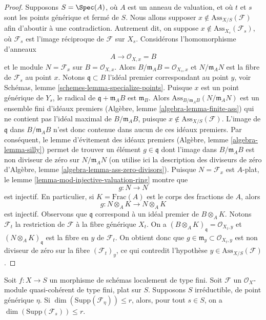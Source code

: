 \begin{proof}
\medskip\noindent
Supposons $S = \Spec(A)$, où $A$ est un anneau de valuation,
et où $t$ et $s$ sont les points générique et fermé de $S$.
Nous allons supposer $x \not \in \text{Ass}_{X/S}(\mathcal{F})$
afin d'aboutir à une contradiction. Autrement dit, on suppose
$x \not \in \text{Ass}_{X_s}(\mathcal{F}_s)$, où
$\mathcal{F}_s$ est l'image réciproque de $\mathcal{F}$ sur $X_s$.
Considérons l'homomorphisme d'anneaux
$$
A \longrightarrow \mathcal{O}_{X, x} = B
$$
et le module $N = \mathcal{F}_x$ sur $B = \mathcal{O}_{X, x}$.
Alors $B/\mathfrak m_A B = \mathcal{O}_{X_s, x}$ et
$N/\mathfrak m_A N$ est la fibre de $\mathcal{F}_s$ au point $x$.
Notons $\mathfrak q \subset B$ l'idéal premier correspondant au
point $y$, voir Schémas, lemme \ref{schemes-lemma-specialize-points}.
Puisque $x$ est un point générique de $Y_s$, le radical de
$\mathfrak q + \mathfrak m_A B$ est $\mathfrak m_B$.
Alors $\text{Ass}_{B/\mathfrak m_A B}(N/\mathfrak m_A N)$
est un ensemble fini d'idéaux premiers (Algèbre, lemme \ref{algebra-lemma-finite-ass})
qui ne contient pas l'idéal maximal de $B/\mathfrak m_A B$,
puisque $x \not \in \text{Ass}_{X/S}(\mathcal{F})$.
L'image de $\mathfrak q$ dans $B/\mathfrak m_A B$ n'est donc contenue
dans aucun de ces idéaux premiers. Par conséquent,
le lemme d'évitement des idéaux premiers (Algèbre, lemme \ref{algebra-lemma-silly})
permet de trouver un élément $g \in \mathfrak q$
dont l'image dans $B/\mathfrak m_A B$ est non diviseur de zéro sur
$N/\mathfrak m_A N$ (on utilise ici la description des diviseurs de zéro
d'Algèbre, lemme \ref{algebra-lemma-ass-zero-divisors}). Puisque
$N = \mathcal{F}_x$ est $A$-plat, le
lemme \ref{lemma-mod-injective-valuation-ring} montre que
$$
g : N \longrightarrow N
$$
est injectif. En particulier, si $K = \text{Frac}(A)$ est le
corps des fractions de $A$, alors
$$
g : N \otimes_A K \longrightarrow N \otimes_A K
$$
est injectif. Observons que $\mathfrak q$ correspond à un
idéal premier de $B \otimes_A K$. Notons $\mathcal{F}_t$ la
restriction de $\mathcal{F}$ à la fibre générique $X_t$. On a
$(B \otimes_A K)_{\mathfrak q} = \mathcal{O}_{X_t, y}$
et $(N \otimes_A K)_\mathfrak q$
est la fibre en $y$ de $\mathcal{F}_t$. On obtient donc
que $g \in \mathfrak m_y \subset \mathcal{O}_{X_t, y}$
est non diviseur de zéro sur la fibre $(\mathcal{F}_t)_y$,
ce qui contredit l'hypothèse $y \in \text{Ass}_{X/S}(\mathcal{F})$.
\end{proof}

\begin{lemma}
\label{lemma-relative-dimension-support-flat}
Soit $f : X \to S$ un morphisme de schémas localement de type fini.
Soit $\mathcal{F}$ un $\mathcal{O}_X$-module quasi-cohérent de type fini,
plat sur $S$. Supposons $S$ irréductible, de point générique $\eta$.
Si $\dim(\text{Supp}(\mathcal{F}_\eta)) \leq r$, alors, pour tout $s \in S$,
on a $\dim(\text{Supp}(\mathcal{F}_s)) \leq r$.
\end{lemma}

